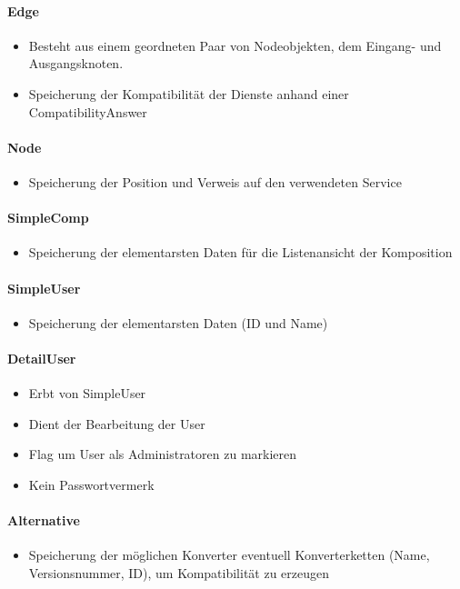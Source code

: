 \paragraph{Edge}
\begin{itemize}
	\item Besteht aus einem geordneten Paar von Nodeobjekten, dem Eingang- und Ausgangsknoten.
	\item Speicherung der Kompatibilität der Dienste anhand einer CompatibilityAnswer
\end{itemize}
\paragraph{Node} 
\begin{itemize}
	\item Speicherung der Position und Verweis auf den verwendeten Service
\end{itemize}
\paragraph{SimpleComp}
\begin{itemize}
	\item Speicherung der elementarsten Daten für die Listenansicht der Komposition
\end{itemize}
\paragraph{SimpleUser}
\begin{itemize}
	\item Speicherung der elementarsten Daten (ID und Name)
\end{itemize}
\paragraph{DetailUser}
\begin{itemize}
	\item Erbt von SimpleUser
	\item Dient der Bearbeitung der User
	\item Flag um User als Administratoren zu markieren
	\item Kein Passwortvermerk
\end{itemize}
\paragraph{Alternative}
\begin{itemize}
	\item Speicherung der möglichen Konverter eventuell Konverterketten (Name, Versionsnummer, ID), um Kompatibilität zu erzeugen
\end{itemize}
